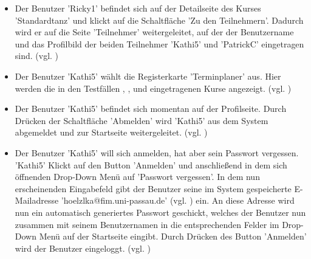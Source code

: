 \documentclass[a4paper]{scrreprt}
\begin{document}
\begin{itemize}
				\item {}
				Der Benutzer 'Ricky1' befindet sich auf der Detailseite des Kurses 'Standardtanz' und klickt auf die Schaltfläche 'Zu den Teilnehmern'. Dadurch wird er auf die Seite 'Teilnehmer' weitergeleitet, auf der der Benutzername und das Profilbild der beiden Teilnehmer 'Kathi5' und 'PatrickC' eingetragen sind. (vgl. )
				
				\item {}
				Der Benutzer 'Kathi5' wählt die Registerkarte 'Terminplaner' aus. Hier werden die in den Testfällen , ,  und  eingetragenen Kurse angezeigt. (vgl. )
			
				\item {}
				Der Benutzer 'Kathi5' befindet sich momentan auf der Profilseite. Durch Drücken der Schaltfläche 'Abmelden' wird 'Kathi5' aus dem System abgemeldet und zur Startseite weitergeleitet. (vgl. )
					
				\item {}
				Der Benutzer 'Kathi5' will sich anmelden, hat aber sein Passwort vergessen. 'Kathi5' Klickt auf den Button 'Anmelden' und anschließend in dem sich öffnenden Drop-Down Menü auf 'Passwort vergessen'. In dem nun erscheinenden Eingabefeld gibt der Benutzer seine im System gespeicherte E-Mailadresse 'hoelzlka@fim.uni-passau.de' (vgl. ) ein. An diese Adresse wird nun ein automatisch generiertes Passwort geschickt, welches der Benutzer nun zusammen mit seinem Benutzernamen in die entsprechenden Felder im Drop-Down Menü auf der Startseite eingibt. Durch Drücken des Button 'Anmelden' wird der Benutzer eingeloggt. (vgl. )
					
			\end{itemize}
\end{document}
